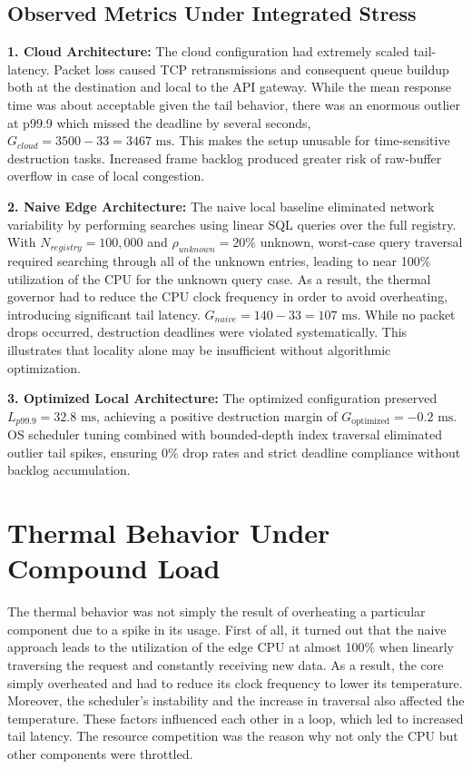 \documentclass[conference]{IEEEtran}
\begin{document}
\subsection{Observed Metrics Under Integrated Stress}

\textbf{1. Cloud Architecture:} The cloud configuration had extremely scaled tail-latency. Packet loss caused TCP retransmissions and consequent queue buildup both at the destination and local to the API gateway. While the mean response time was about acceptable given the tail behavior, there was an enormous outlier at p99.9 which missed the deadline by several seconds, $G_{cloud} = 3500 - 33 = 3467\text{ ms}$. This makes the setup unusable for time-sensitive destruction tasks. Increased frame backlog produced greater risk of raw-buffer overflow in case of local congestion.

\textbf{2. Naive Edge Architecture:} The naive local baseline eliminated network variability by performing searches using linear SQL queries over the full registry. With $N_{registry} = 100,000$ and $\rho_{unknown} = 20\%$ unknown, worst-case query traversal required searching through all of the unknown entries, leading to near 100\% utilization of the CPU for the unknown query case. As a result, the thermal governor had to reduce the CPU clock frequency in order to avoid overheating, introducing significant tail latency. $G_{naive} = 140 - 33 = 107\text{ ms}$. While no packet drops occurred, destruction deadlines were violated systematically. This illustrates that locality alone may be insufficient without algorithmic optimization.

\textbf{3. Optimized Local Architecture:} The optimized configuration preserved $L_{p99.9} = 32.8\text{ ms}$, achieving a positive destruction margin of $G_{\mathrm{optimized}} = -0.2\text{ ms}$. OS scheduler tuning combined with bounded-depth index traversal eliminated outlier tail spikes, ensuring 0\% drop rates and strict deadline compliance without backlog accumulation.

\section{Thermal Behavior Under Compound Load}

The thermal behavior was not simply the result of overheating a particular component due to a spike in its usage. First of all, it turned out that the naive approach leads to the utilization of the edge CPU at almost 100\% when linearly traversing the request and constantly receiving new data. As a result, the core simply overheated and had to reduce its clock frequency to lower its temperature. Moreover, the scheduler’s instability and the increase in traversal also affected the temperature. These factors influenced each other in a loop, which led to increased tail latency. The resource competition was the reason why not only the CPU but other components were throttled.
\end{document}
